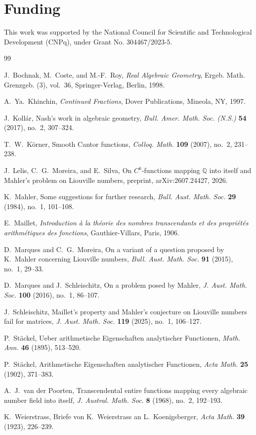 \documentclass[11pt,reqno]{amsart}
\numberwithin{equation}{section}
\theoremstyle{definition}
\theoremstyle{remark}
\begin{document}
\section*{Funding}

This work was supported by the National Council for Scientific and Technological Development (CNPq), under
Grant No. 304467/2023-5.



\begin{thebibliography}{99}

J.~Bochnak, M.~Coste, and M.-F.~Roy,
\emph{Real Algebraic Geometry},
Ergeb. Math. Grenzgeb. (3), vol.~36,
Springer-Verlag, Berlin, 1998.

A.~Ya.~Khinchin,
\emph{Continued Fractions},
Dover Publications, Mineola, NY, 1997.

J.~Koll\'ar,
Nash's work in algebraic geometry,
\emph{Bull. Amer. Math. Soc. (N.S.)} \textbf{54} (2017), no.~2, 307--324.

T.~W.~K\"orner,
Smooth Cantor functions,
\emph{Colloq. Math.} \textbf{109} (2007), no.~2, 231--238.

J.~Lelis, C.~G.~Moreira, and E.~Silva,
On $C^k$-functions mapping $\mathbb Q$ into itself and Mahler's problem on Liouville numbers,
preprint, arXiv:2607.24427, 2026.

K.~Mahler,
Some suggestions for further research,
\emph{Bull. Aust. Math. Soc.} \textbf{29} (1984), no.~1, 101--108.

E.~Maillet,
\emph{Introduction \`a la th\'eorie des nombres transcendants et des propri\'et\'es arithm\'etiques des fonctions},
Gauthier-Villars, Paris, 1906.

D.~Marques and C.~G.~Moreira,
On a variant of a question proposed by K.~Mahler concerning Liouville numbers,
\emph{Bull. Aust. Math. Soc.} \textbf{91} (2015), no.~1, 29--33.

D.~Marques and J.~Schleischitz,
On a problem posed by Mahler,
\emph{J. Aust. Math. Soc.} \textbf{100} (2016), no.~1, 86--107.

J.~Schleischitz,
Maillet's property and Mahler's conjecture on Liouville numbers fail for matrices,
\emph{J. Aust. Math. Soc.} \textbf{119} (2025), no.~1, 106--127.

P.~St\"ackel,
Ueber arithmetische Eigenschaften analytischer Functionen,
\emph{Math. Ann.} \textbf{46} (1895), 513--520.

P.~St\"ackel,
Arithmetische Eigenschaften analytischer Functionen,
\emph{Acta Math.} \textbf{25} (1902), 371--383.

A.~J.~van der Poorten,
Transcendental entire functions mapping every algebraic number field into itself,
\emph{J. Austral. Math. Soc.} \textbf{8} (1968), no.~2, 192--193.

K.~Weierstrass,
Briefe von K.~Weierstrass an L.~Koenigsberger,
\emph{Acta Math.} \textbf{39} (1923), 226--239.

\end{thebibliography}
\end{document}
